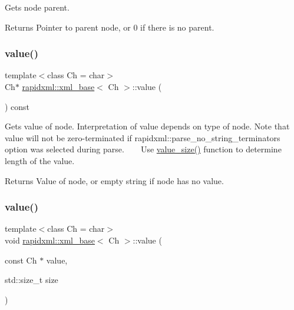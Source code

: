 Gets node parent. \begin{DoxyReturn}{Returns}
Pointer to parent node, or 0 if there is no parent. 
\end{DoxyReturn}
\mbox{\label{classrapidxml_1_1xml__base_a6af65de5e59ac497cd69838f8a89d602}} 
\subsubsection{\texorpdfstring{value()}{value()}\hspace{0.1cm}{\footnotesize\ttfamily [1/3]}}
{\footnotesize\ttfamily template$<$class Ch  = char$>$ \\
Ch$\ast$ \mbox{\hyperlink{classrapidxml_1_1xml__base}{rapidxml\+::xml\+\_\+base}}$<$ Ch $>$\+::value (\begin{DoxyParamCaption}{ }\end{DoxyParamCaption}) const\hspace{0.3cm}{\ttfamily [inline]}}

Gets value of node. Interpretation of value depends on type of node. Note that value will not be zero-\/terminated if rapidxml\+::parse\+\_\+no\+\_\+string\+\_\+terminators option was selected during parse. ~\newline
~\newline
 Use \mbox{\hyperlink{classrapidxml_1_1xml__base_a2eb123d471b1567fa4832b6ee2b75493}{value\+\_\+size()}} function to determine length of the value. \begin{DoxyReturn}{Returns}
Value of node, or empty string if node has no value. 
\end{DoxyReturn}
\mbox{\label{classrapidxml_1_1xml__base_a3b183c2db7022a6d30494dd2f0ac11e9}} 
\subsubsection{\texorpdfstring{value()}{value()}\hspace{0.1cm}{\footnotesize\ttfamily [2/3]}}
{\footnotesize\ttfamily template$<$class Ch  = char$>$ \\
void \mbox{\hyperlink{classrapidxml_1_1xml__base}{rapidxml\+::xml\+\_\+base}}$<$ Ch $>$\+::value (\begin{DoxyParamCaption}\item[{const Ch $\ast$}]{value,  }\item[{std\+::size\+\_\+t}]{size }\end{DoxyParamCaption})\hspace{0.3cm}{\ttfamily [inline]}}

